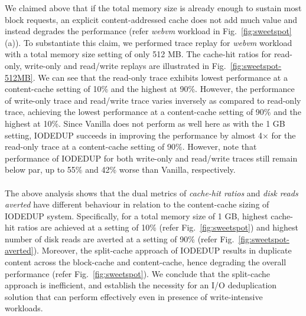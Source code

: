 We claimed above that if the total memory
size is already enough to sustain most block requests,
an explicit content-addressed cache does not add much value
and instead degrades the performance (refer
\textit{webvm} workload in Fig.~\ref{fig:sweetspot}(a)).
To substantiate this claim, we performed trace replay for \textit{webvm}
workload with a total memory size setting of only 512 MB. The cache-hit
ratios for read-only, write-only
and read/write replays are illustrated in Fig.~\ref{fig:sweetspot-512MB}.
We can see that the read-only trace exhibits
lowest performance at a content-cache setting of 10\% and the highest
at 90\%. However, the performance of write-only trace and read/write trace
varies inversely as compared to read-only trace, achieving the lowest
performance at a content-cache setting of 90\% and the highest
at 10\%.
Since Vanilla does not perform as well here as with the 1 GB
setting, IODEDUP succeeds in improving the performance by
almost 4$\times$ for the read-only trace
at a content-cache setting of 90\%. However, note that performance of
IODEDUP for both write-only and read/write traces still remain below par,
up to 55\% and 42\% worse than Vanilla, respectively.
\\
\\
The above analysis shows that the dual metrics of \textit{cache-hit
ratios} and \textit{disk reads averted} have different behaviour in relation to the
content-cache sizing of IODEDUP system. Specifically,
for a total memory size of 1 GB,
highest cache-hit
ratios are achieved at a setting of 10\% (refer Fig.~\ref{fig:sweetspot})
and highest number of disk reads
are averted at a setting of 90\% (refer Fig.~\ref{fig:sweetspot-averted}).
Moreover,
the split-cache approach of IODEDUP results in duplicate content across the
block-cache and content-cache, hence degrading the overall performance
(refer Fig.~\ref{fig:sweetspot}).
We conclude that the split-cache approach is inefficient, 
and establish the necessity
for an I/O deduplication solution that can perform effectively
even in presence of write-intensive workloads.

